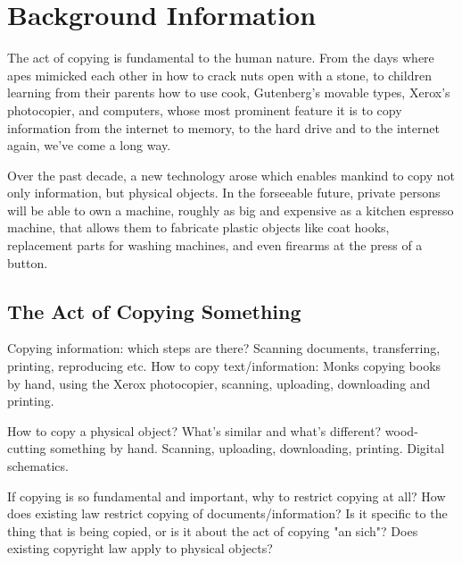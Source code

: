 \section{Background Information}

The act of copying is fundamental to the human nature.  From the days where apes
mimicked each other in how to crack nuts open with a stone, to children learning
from their parents how to use cook, Gutenberg's movable types, Xerox's
photocopier, and computers, whose most prominent feature it is to copy
information from the internet to memory, to the hard drive and to the internet
again, we've come a long way.

Over the past decade, a new technology arose which enables mankind to copy not
only information, but physical objects.  In the forseeable future, private
persons will be able to own a machine, roughly as big and expensive as a
kitchen espresso machine, that allows them to fabricate plastic objects like
coat hooks, replacement parts for washing machines, and even firearms at the
press of a button.

\subsection{The Act of Copying Something}

Copying information: which steps are there?  Scanning documents, transferring,
printing, reproducing etc.  How to copy text/information: Monks copying books
by hand, using the Xerox photocopier, scanning, uploading, downloading and
printing.

How to copy a physical object?  What's similar and what's different?
wood-cutting something by hand.  Scanning, uploading, downloading, printing.
Digital schematics.

If copying is so fundamental and important, why to restrict copying at all?
How does existing law restrict copying of documents/information?  Is it
specific to the thing that is being copied, or is it about the act of copying
"an sich"?  Does existing copyright law apply to physical objects?
